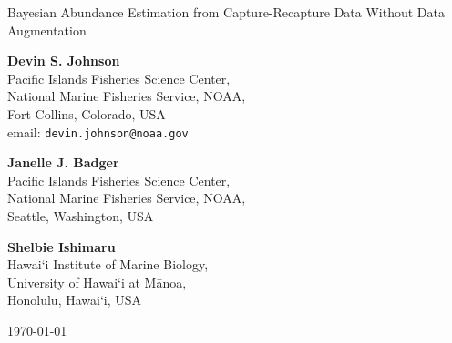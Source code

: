 \documentclass[12pt]{article}
\begin{document}

\vspace*{1in}

\setlength{\parindent}{0pt}
\renewcommand{\baselinestretch}{1.8}\normalsize

\begin{center}
\noindent\hrulefill

{\Large Bayesian Abundance Estimation from Capture-Recapture Data Without Data Augmentation} 

\noindent\hrulefill

\end{center}

\renewcommand{\baselinestretch}{1.15}\normalsize 
\bigskip

\begin{center}
{\bf Devin S. Johnson}\\
 Pacific Islands Fisheries Science Center,\\
 National Marine Fisheries Service, NOAA, \\
 Fort Collins, Colorado, USA \\
 email: {\tt devin.johnson@noaa.gov} \\ \bigskip

{\bf Janelle J. Badger} \\
 Pacific Islands Fisheries Science Center,\\
 National Marine Fisheries Service, NOAA, \\
 Seattle, Washington, USA \\ \bigskip

{\bf Shelbie Ishimaru} \\
Hawai`i Institute of Marine Biology, \\
University of Hawai`i at Mānoa, \\
Honolulu, Hawai`i, USA\\ \bigskip

\bigskip

\today

\end{center}

\vspace*{\fill}

\clearpage




\linenumbers

\end{document}
